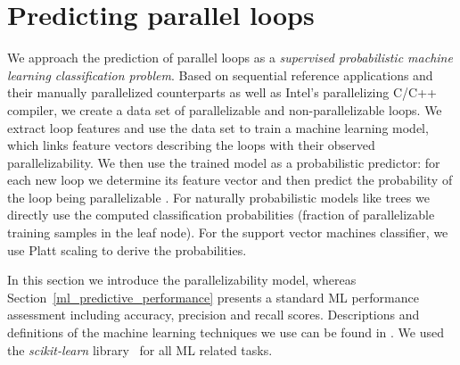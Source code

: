 \section{Predicting parallel loops}
\label{predicting_parallel_loops}
\quad We approach the prediction of parallel loops as a \emph{supervised probabilistic machine learning classification problem}. Based on sequential reference applications and their manually parallelized counterparts as well as Intel's parallelizing C/C++ compiler, we create a data set of parallelizable and non-parallelizable loops. We extract loop features and use the data set to train a machine learning model, which links feature vectors describing the loops with their observed parallelizability. We then use the trained model as a probabilistic predictor: for each new loop we determine its feature vector and then predict the probability of the loop being parallelizable \cite{Niculescu-Mizil:2005:PGP:1102351.1102430}. For naturally probabilistic models like trees we directly use the computed classification probabilities (fraction of parallelizable training samples in the leaf node). For the support vector machines classifier, we use Platt scaling to derive the probabilities.

In this section we introduce the parallelizability model, whereas Section~\ref{ml_predictive_performance} presents a standard ML performance assessment including accuracy, precision and recall scores. Descriptions and definitions of the machine learning techniques we use can be found in \cite{James:2013:ISL:2517747}. We used the \textit{scikit-learn} library~\cite{scikit-learn} for all ML related tasks.

